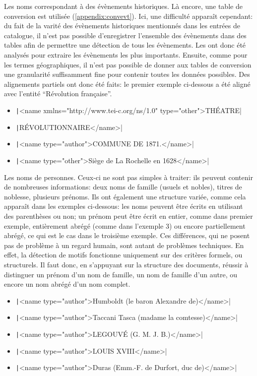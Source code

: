 Les noms correspondant à des évènements historiques. Là encore, une table de conversion est utilisée (\ref{appendix:convevt}). Ici, une difficulté apparaît cependant: du fait de la varité des évènements historiques mentionnés dans les entrées de catalogue, il n'est pas possible d'enregistrer l'ensemble des évènements dans des tables afin de permettre une détection de tous les évènements. Les \tname{} ont donc été analysés pour extraire les évènements les plus importants. Ensuite, comme pour les termes géographiques, il n'est pas possible de donner aux tables de conversion une granularité suffisamment fine pour contenir toutes les données possibles. Des alignements partiels ont donc été faits: le premier exemple ci-dessous a été aligné avec l'entité \wkd{} \enquote{Révolution française}.
\begin{itemize}
	\item \texttt|<name xmlns="http://www.tei-c.org/ns/1.0" type="other">THÉATRE|
\end{itemize}
\begin{itemize}[label={}]
	\item \texttt|RÉVOLUTIONNAIRE</name>|
\end{itemize}
\begin{itemize}
	\item \texttt|<name type="author">COMMUNE DE 1871.</name>|
	\item \texttt|<name type="other">Siège de La Rochelle en 1628</name>|
\end{itemize}

Les noms de personnes. Ceux-ci ne sont pas simples à traiter: ils peuvent contenir de nombreuses informations: deux noms de famille (usuels et nobles), titres de noblesse, plusieurs prénoms. Ils ont également une structure variée, comme cela apparaît dans les exemples ci-dessous: les noms peuvent être écrits en utilisant des parenthèses ou non; un prénom peut être écrit en entier, comme dans premier exemple, entièrement abrégé (comme dans l'exemple 3) ou encore partiellement abrégé, ce qui est le cas dans le troisième exemple. Ces différences, qui ne posent pas de problème à un regard humain, sont autant de problèmes techniques. En effet, la détection de motifs fonctionne uniquement sur des critères formels, ou structurels. Il faut donc, en s'appuyant sur la structure des documents, réussir à distinguer un prénom d'un nom de famille, un nom de famille d'un autre, ou encore un nom abrégé d'un nom complet.
\begin{itemize}
	\item \texttt|<name type="author">Humboldt (le baron Alexandre de)</name>|
	\item \texttt|<name type="author">Taccani Tasca (madame la comtesse)</name>|
	\item \texttt|<name type="author">LEGOUVÉ (G. M. J. B.)</name>|
	\item \texttt|<name type="author">LOUIS XVIII</name>|
	\item \texttt|<name type="author">Duras (Emm.-F. de Durfort, duc de)</name>|
\end{itemize}

